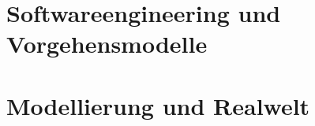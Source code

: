 
\thispagestyle{empty}
\sttpDeckblatt{\Kursautor}{\Modulnummer}{\Modulname}{}{}{}

\cleardoublepage

{}
\tableofcontents

\cleardoublepage
\part{Softwareengineering und Vorgehensmodelle}
\label{sec:Lektion-1}
\sttpDeckblattRueckseite{\partname~\thepart}%


\cleardoublepage
\chaptertoc %

\begin{refsection}
	
	
	\cleardoublepage %
	\printbibliography[heading=subbibliography]
\end{refsection}

\cleardoublepage
\part{Modellierung und Realwelt}
\label{sec:Lektion-2}
\sttpDeckblattRueckseite{\partname~\thepart}%

\cleardoublepage
\chaptertoc %

\begin{refsection}
	
	
	\cleardoublepage %
	\printbibliography[heading=subbibliography]
\end{refsection}

